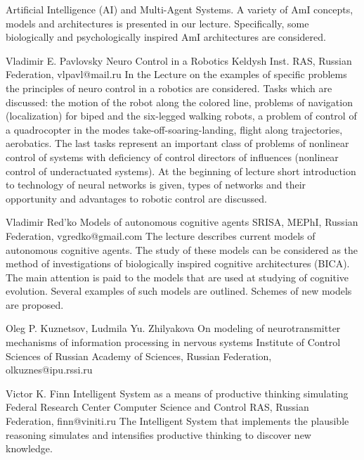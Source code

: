 \documentclass[10pt,fleqn,openany]{book} %
\begin{document}
\begin{enumerate}
{Artificial Intelligence (AI) and Multi-Agent Systems. A variety of AmI concepts, models and architectures is presented in our lecture. Specifically, some biologically and psychologically inspired AmI architectures are considered.}
		
	\paperabstract
		{Vladimir E. Pavlovsky}
		{Neuro Control in a Robotics}
		{Keldysh Inst. RAS, Russian Federation, vlpavl@mail.ru}
		{
			In the Lecture on the examples of specific problems the principles of neuro control in a robotics are considered. Tasks which are discussed: the motion of the robot along the colored line, problems of navigation (localization) for biped and the six-legged walking robots, a problem of control of a quadrocopter in the modes take-off-soaring-landing, flight along trajectories, aerobatics. The last tasks represent an important class of problems of nonlinear control of systems with deficiency of control directors of influences (nonlinear control of underactuated systems). At the beginning of lecture short introduction to technology of neural networks is given, types of networks and their opportunity and advantages to robotic control are discussed.}
		
	\paperabstract
		{Vladimir Red'ko}
		{Models of autonomous cognitive agents}
		{SRISA, MEPhI, Russian Federation, vgredko@gmail.com}
		{
			The lecture describes current models of autonomous cognitive agents. The study of these models can be considered as the method of investigations of biologically inspired cognitive architectures (BICA). The main attention is paid to the models that are used at studying of cognitive evolution. Several examples of such models are outlined. Schemes of new models are proposed.}
		
	\paperabstract
		{Oleg P. Kuznetsov, Ludmila Yu. Zhilyakova}
		{On modeling of neurotransmitter mechanisms of information processing in nervous systems}
		{Institute of Control Sciences of Russian Academy of Sciences, Russian Federation, olkuznes@ipu.rssi.ru}
		{}
		
	\paperabstract
		{Victor K. Finn}
		{Intelligent System as a means of productive thinking simulating}
		{Federal Research Center Computer Science and Control RAS, Russian Federation, finn@viniti.ru}
		{
			The Intelligent System that implements the plausible reasoning simulates and intensifies productive thinking to discover new knowledge.}
		

\end{enumerate}
\end{document}
